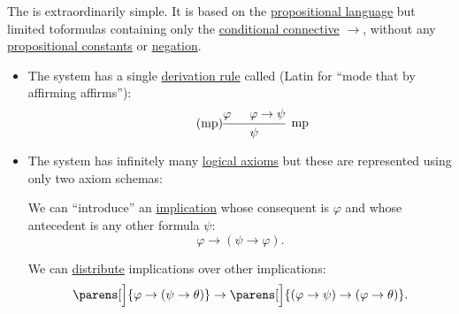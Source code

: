 \begin{definition}\label{def:positive_implicational_propositional_derivation_system}
  The  is extraordinarily simple. It is based on the \hyperref[def:propositional_language]{propositional language} but limited toformulas containing only the \hyperref[def:propositional_language/connectives/conditional]{conditional connective} \( \rightarrow \), without any \hyperref[def:propositional_language/constants]{propositional constants} or \hyperref[def:propositional_language/negation]{negation}.

  \begin{itemize}
    \item The system has a single \hyperref[def:logical_derivation_system/rules]{derivation rule} called  (Latin for \enquote{mode that by affirming affirms}):
    \begin{equation}\label{eq:def:positive_implicational_propositional_derivation_system/rules/modus_ponens}\tag{mp}
      \begin{prooftree}
        \hypo{\varphi}
        \hypo{\varphi \rightarrow \psi}
        \infer2[mp]{\psi}
      \end{prooftree}
    \end{equation}

    \item The system has infinitely many \hyperref[def:logical_derivation_system/axioms]{logical axioms} but these are represented using only two axiom schemas:
    \begin{thmenum}
       We can \enquote{introduce} an \hyperref[def:material_implication]{implication} whose consequent is \( \varphi \) and whose antecedent is any other formula \( \psi \):
      \begin{equation}\label{eq:def:positive_implicational_propositional_derivation_system/axioms/imp_intro}
        \varphi \rightarrow (\psi \rightarrow \varphi).
      \end{equation}

       We can \hyperref[def:semiring/distributivity]{distribute} implications over other implications:
      \begin{equation}\label{eq:def:positive_implicational_propositional_derivation_system/axioms/imp_distr}
        \parens[\Big]{ \varphi \rightarrow (\psi \rightarrow \theta) } \rightarrow \parens[\Big]{ (\varphi \rightarrow \psi) \rightarrow (\varphi \rightarrow \theta)}.
      \end{equation}
    \end{thmenum}
  \end{itemize}


\end{definition}
